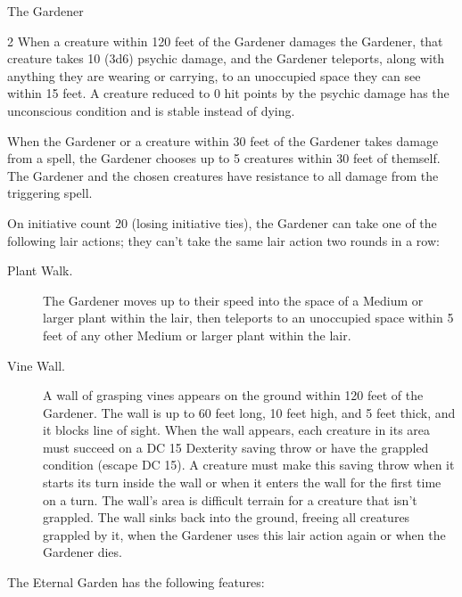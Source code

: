 \documentclass[10pt,a4paper,twoside,bg=print,twocolumn,openany,nodeprecatedcode]{dndbook}
\begin{document}
\begin{DndMonster}[float*=b,width=\textwidth + 8pt]{The Gardener}
\begin{multicols}{2}
When a creature within 120 feet of the Gardener damages the Gardener, that creature takes 10 (3d6) psychic damage, and the Gardener teleports, along with anything they are wearing or carrying, to an unoccupied space they can see within 15 feet. A creature reduced to 0 hit points by the psychic damage has the unconscious condition and is stable instead of dying.

When the Gardener or a creature within 30 feet of the Gardener takes damage from a spell, the Gardener chooses up to 5 creatures within 30 feet of themself. The Gardener and the chosen creatures have resistance to all damage from the triggering spell.

On initiative count 20 (losing initiative ties), the Gardener can take one of the following lair actions; they can't take the same lair action two rounds in a row:


\begin{description}
\item[Plant Walk.]
The Gardener moves up to their speed into the space of a Medium or larger plant within the lair, then teleports to an unoccupied space within 5 feet of any other Medium or larger plant within the lair.
\item[Vine Wall.]
A wall of grasping vines appears on the ground within 120 feet of the Gardener. The wall is up to 60 feet long, 10 feet high, and 5 feet thick, and it blocks line of sight. When the wall appears, each creature in its area must succeed on a DC 15 Dexterity saving throw or have the grappled condition (escape DC 15). A creature must make this saving throw when it starts its turn inside the wall or when it enters the wall for the first time on a turn. The wall's area is difficult terrain for a creature that isn't grappled. The wall sinks back into the ground, freeing all creatures grappled by it, when the Gardener uses this lair action again or when the Gardener dies.
\end{description}

The Eternal Garden has the following features:



\end{multicols}
\end{DndMonster}
\end{document}
